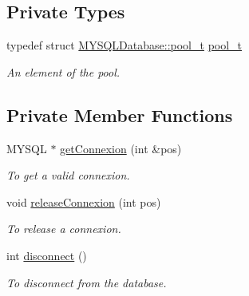 \subsection*{Private Types}
\begin{DoxyCompactItemize}
\item 
\hypertarget{classMYSQLDatabase_a50a4db462aa1443e1bf95f302c5d1667}{
typedef struct \hyperlink{structMYSQLDatabase_1_1pool__t}{MYSQLDatabase::pool\_\-t} \hyperlink{classMYSQLDatabase_a50a4db462aa1443e1bf95f302c5d1667}{pool\_\-t}}
\label{classMYSQLDatabase_a50a4db462aa1443e1bf95f302c5d1667}

\begin{DoxyCompactList}\small\item\em An element of the pool. \item\end{DoxyCompactList}\end{DoxyCompactItemize}
\subsection*{Private Member Functions}
\begin{DoxyCompactItemize}
\item 
MYSQL $\ast$ \hyperlink{classMYSQLDatabase_a5ada78b55aa03323946486df4644d0a0}{getConnexion} (int \&pos)
\begin{DoxyCompactList}\small\item\em To get a valid connexion. \item\end{DoxyCompactList}\item 
void \hyperlink{classMYSQLDatabase_a2f54fedb92297729fb59becefe214928}{releaseConnexion} (int pos)
\begin{DoxyCompactList}\small\item\em To release a connexion. \item\end{DoxyCompactList}\item 
int \hyperlink{classMYSQLDatabase_a4dc57bd6bec47b4e0c19163c1d6c7fbe}{disconnect} ()
\begin{DoxyCompactList}\small\item\em To disconnect from the database. \item\end{DoxyCompactList}\end{DoxyCompactItemize}

